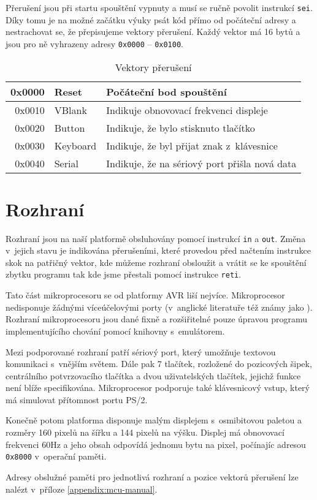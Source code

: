 Přerušení jsou při startu spouštění vypnuty a musí se ručně povolit instrukcí \texttt{sei}. Díky tomu je na možné začátku výuky psát kód přímo od počáteční adresy a nestrachovat se, že přepisujeme vektory přerušení. Každý vektor má 16 bytů a jsou pro ně vyhrazeny adresy \texttt{0x0000} -- \texttt{0x0100}. 

\begin{table}[htbp]
\begin{center}
\begin{tabular}{| r | l | l |}
\hline
0x0000 & Reset    & Počáteční bod spouštění \\ \hline
0x0010 & VBlank	  & Indikuje obnovovací frekvenci displeje \\ \hline
0x0020 & Button   & Indikuje, že bylo stisknuto tlačítko \\ \hline
0x0030 & Keyboard & Indikuje, že byl přijat znak z~klávesnice \\ \hline
0x0040 & Serial   & Indikuje, že na sériový port přišla nová data \\
\hline
\end{tabular}
\end{center}
\caption{Vektory přerušení}
\label{tbl:vector-positions}
\end{table}

\section{Rozhraní}

Rozhraní jsou na naší platformě obsluhovány pomocí instrukcí \texttt{in} a \texttt{out}. Změna v~jejich stavu je indikována přerušeními, které provedou před načtením instrukce skok na patřičný vektor, kde můžeme rozhraní obsloužit a vrátit se ke spouštění zbytku programu tak kde jsme přestali pomocí instrukce \texttt{reti}.

Tato část mikroprocesoru se od platformy AVR liší nejvíce. Mikroprocesor nedisponuje žádnými víceúčelovými porty (v~anglické literatuře též známy jako ). Rozhraní mikroprocesoru jsou dané fixně a rozšiřitelné pouze úpravou programu implementujícího chování pomocí knihovny s~emulátorem.

Mezi podporované rozhraní patří sériový port, který umožňuje textovou komunikaci s~vnějším světem. Dále pak 7 tlačítek, rozložené do pozicových šipek, centrálního potvrzovacího tlačítka a dvou uživatelských tlačítek, jejichž funkce není blíže specifikována. Mikroprocesor podporuje také klávesnicový vstup, který má simulovat přítomnost portu PS/2.

Konečně potom platforma disponuje malým displejem s~osmibitovou paletou a rozměry 160 pixelů na šířku a 144 pixelů na výšku. Displej má obnovovací frekvenci 60Hz a jeho obsah odpovídá jednomu bytu na pixel, počínajíc adresou \texttt{0x8000} v~operační paměti.

Adresy obslužné paměti pro jednotlivá rozhraní a pozice vektorů přerušení lze nalézt v~příloze \ref{appendix:mcu-manual}.
